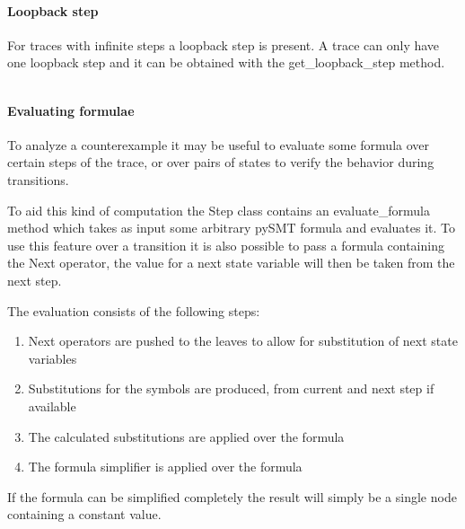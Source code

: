 \paragraph*{Loopback step}
For traces with infinite steps a loopback step is present. A trace can only have one loopback step and it can be obtained with the get\_loopback\_step method.

\inputminted[firstline=57, lastline=59]{python3}{py/model_checking.py}

\paragraph*{Evaluating formulae}
To analyze a counterexample it may be useful to evaluate some formula over certain steps of the trace, or over pairs of states to verify the behavior during transitions.

To aid this kind of computation the Step class contains an evaluate\_formula method which takes as input some arbitrary pySMT formula and evaluates it.
To use this feature over a transition it is also possible to pass a formula containing the Next operator, the value for a next state variable will then be taken from the next step.

The evaluation consists of the following steps:
\begin{enumerate}
    \item Next operators are pushed to the leaves to allow for substitution of next state variables
    \item Substitutions for the symbols are produced, from current and next step if available
    \item The calculated substitutions are applied over the formula
    \item The formula simplifier is applied over the formula
\end{enumerate}

If the formula can be simplified completely the result will simply be a single node containing a constant value.

\inputminted[firstline=7]{python3}{py/formula_evaluation.py}
